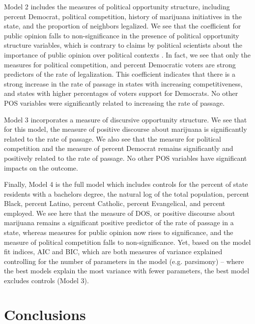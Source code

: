 Model 2 includes the measures of political opportunity structure, including percent Democrat, political competition, history of marijuana initiatives in the state, and the proportion of neighbors legalized. We see that the coefficient for public opinion falls to non-significance in the presence of political opportunity structure variables, which is contrary to claims by political scientists about the importance of public opinion over political contexts \citep{burstein_and_linton_2002}. In fact, we see that only the measures for political competition, and percent Democratic voters are strong predictors of the rate of legalization. This coefficient indicates that there is a strong increase in the rate of passage in states with increasing competitiveness, and states with higher percentages of voters support for Democrats. No other POS variables were significantly related to increasing the rate of passage. 

Model 3 incorporates a measure of discursive opportunity structure. We see that for this model, the measure of positive discourse about marijuana is significantly related to the rate of passage. We also see that the measure for political competition and the measure of percent Democrat remains significantly and positively related to the rate of passage. No other POS variables have significant impacts on the outcome.

Finally, Model 4 is the full model which includes controls for the percent of state residents with a bachelors degree, the natural log of the total population, percent Black, percent Latino, percent Catholic, percent Evangelical, and percent employed. We see here that the measure of DOS, or positive discourse about marijuana remains a significant positive predictor of the rate of passage in a state, whereas measures for public opinion now rises to significance, and the measure of political competition falls to non-significance. Yet, based on the model fit indices, AIC and BIC, which are both measures of variance explained controlling for the number of parameters in the model (e.g. parsimony) -- where the best models explain the most variance with fewer parameters, the best model excludes controls (Model 3).


\section{Conclusions}

